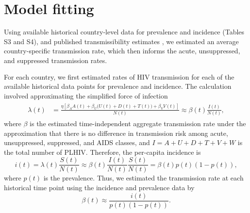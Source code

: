 \documentclass{article}
\begin{document}
\section{Model fitting}
\label{model_fitting}

Using available historical country-level data for prevalence and
incidence (Tables S3 and S4), and published transmissibility estimates
\cite{Wawer2005-us,Donnell2010-xo,Hughes2012-so,Skarbinski2015-ni}, we
estimated an average country-specific transmission rate, which then
informs the acute, unsuppressed, and suppressed transmission rates.


For each country, we first estimated rates of HIV transmission for
each of the available historical data points for prevalence and
incidence.  The calculation involved approximating the simplified
force of infection
\begin{align}
  \label{foi}
  \begin{split}
    \lambda(t) &= \frac{\eta \left[\beta_{A} A(t)
        + \beta_{U} \big(U(t) + D(t) + T(t)\big) +
        \beta_{V} V(t)\right]}{N(t)}
    \approx  \beta(t) \frac{I(t)}{N(t)},
  \end{split}
\end{align}
where $\beta$ is the estimated time-independent aggregate transmission
rate under the approximation that there is no difference in
transmission risk among acute, unsuppressed, suppressed, and AIDS
classes, and $I = A + U + D + T + V + W$ is the total number of
PLHIV.  Therefore, the per-capita incidence is
\begin{equation}
i(t) = \lambda(t) \frac{S(t)}{N(t)}
\approx \beta(t) \frac{I(t)}{N(t)} \frac{S(t)}{N(t)} =\beta(t) p(t) (1-p(t)),
\end{equation}
where $p(t)$ is the prevalence. Thus, we estimated the transmission
rate at each historical time point using the incidence and prevalence
data by
\begin{equation}
  \label{trans_rate}
  \beta(t) \approx \frac{i(t)}{p(t)(1-p(t))}.
\end{equation}
\end{document}
